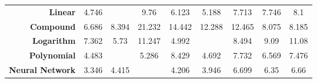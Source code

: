 \begin{table}[H]
\begin{center}
\begin{tabularx}{\textwidth}{r c c c c c c c c}
        \textbf{Linear} &4.746 &\cellcolor{colorgreen}{4.019} &9.76 &6.123 &5.188 &7.713 &7.746 &8.1\\ 
        \textbf{Compound} &6.686 &8.394 &21.232 &14.442 &12.288 &12.465 &8.075 &8.185\\ 
        \textbf{Logarithm} &7.362 &5.73 &11.247 &4.992 &\cellcolor{colorgreen}{4.251} &8.494 &9.09 &11.08\\ 
        \textbf{Polynomial} &4.483 &\cellcolor{colorgreen}{3.894} &5.286 &8.429 &4.692 &7.732 &6.569 &7.476\\ 
        \textbf{Neural Network} &3.346 &4.415 &\cellcolor{colorgreen}{1.316} &4.206 &3.946 &6.699 &6.35 &6.66\\ \midrule 
    \bottomrule
    \end{tabularx}
  \end{center}
\end{table}
